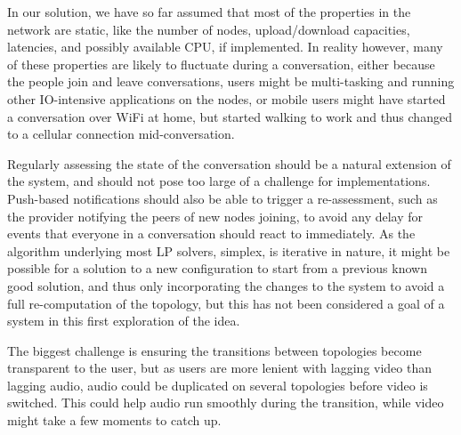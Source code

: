 In our solution, we have so far assumed that most of the properties in the network are static, like the number of nodes, upload/download capacities, latencies, and possibly available CPU, if implemented. In reality however, many of these properties are likely to fluctuate during a conversation, either because the people join and leave conversations, users might be multi-tasking and running other IO-intensive applications on the nodes, or mobile users might have started a conversation over WiFi at home, but started walking to work and thus changed to a cellular connection mid-conversation.

Regularly assessing the state of the conversation should be a natural extension of the system, and should not pose too large of a challenge for implementations. Push-based notifications should also be able to trigger a re-assessment, such as the provider notifying the peers of new nodes joining, to avoid any delay for events that everyone in a conversation should react to immediately. As the algorithm underlying most LP solvers, simplex, is iterative in nature, it might be possible for a solution to a new configuration to start from a previous known good solution, and thus only incorporating the changes to the system to avoid a full re-computation of the topology, but this has not been considered a goal of a system in this first exploration of the idea.

The biggest challenge is ensuring the transitions between topologies become transparent to the user, but as users are more lenient with lagging video than lagging audio, audio could be duplicated on several topologies before video is switched. This could help audio run smoothly during the transition, while video might take a few moments to catch up.
